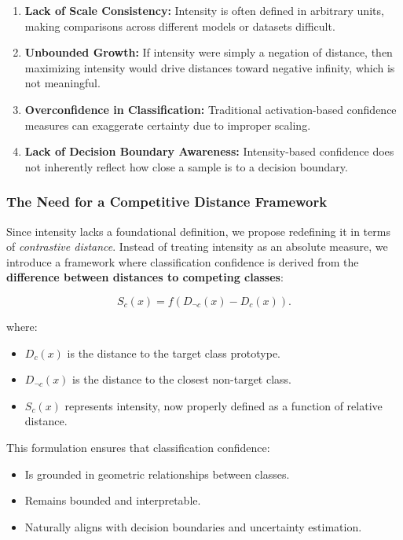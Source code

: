 \documentclass[12pt]{article}
\begin{document}
\begin{enumerate}
    \item \textbf{Lack of Scale Consistency:} Intensity is often defined in arbitrary units, making comparisons across different models or datasets difficult.
    \item \textbf{Unbounded Growth:} If intensity were simply a negation of distance, then maximizing intensity would drive distances toward negative infinity, which is not meaningful.
    \item \textbf{Overconfidence in Classification:} Traditional activation-based confidence measures can exaggerate certainty due to improper scaling.
    \item \textbf{Lack of Decision Boundary Awareness:} Intensity-based confidence does not inherently reflect how close a sample is to a decision boundary.
\end{enumerate}

\subsubsection{The Need for a Competitive Distance Framework}

Since intensity lacks a foundational definition, we propose redefining it in terms of \textit{contrastive distance}. Instead of treating intensity as an absolute measure, we introduce a framework where classification confidence is derived from the \textbf{difference between distances to competing classes}:

\[
S_c(x) = f(D_{\neg c}(x) - D_c(x)).
\]

where:

\begin{itemize}
    \item \( D_c(x) \) is the distance to the target class prototype.
    \item \( D_{\neg c}(x) \) is the distance to the closest non-target class.
    \item \( S_c(x) \) represents intensity, now properly defined as a function of relative distance.
\end{itemize}

This formulation ensures that classification confidence:

\begin{itemize}
    \item Is grounded in geometric relationships between classes.
    \item Remains bounded and interpretable.
    \item Naturally aligns with decision boundaries and uncertainty estimation.
\end{itemize}
\end{document}
